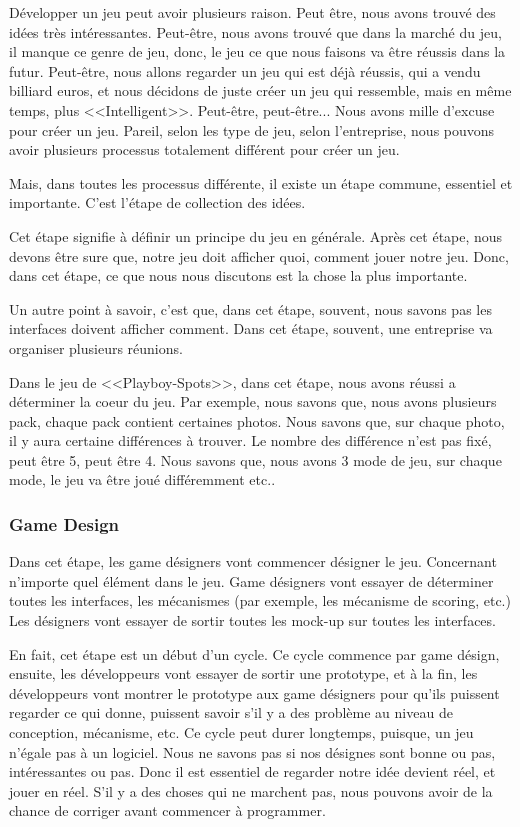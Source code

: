Développer un jeu peut avoir plusieurs raison. Peut être, nous avons trouvé des idées très intéressantes. Peut-être, nous avons trouvé que dans la marché du jeu, il manque ce genre de jeu, donc, le jeu ce que nous faisons va être réussis dans la futur. Peut-être, nous allons regarder un jeu qui est déjà réussis, qui a vendu billiard euros, et nous décidons de juste créer un jeu qui ressemble, mais en même temps, plus <<Intelligent>>. Peut-être, peut-être... Nous avons mille d'excuse pour créer un jeu. Pareil, selon les type de jeu, selon l'entreprise, nous pouvons avoir plusieurs processus totalement différent pour créer un jeu. 

Mais, dans toutes les processus différente, il existe un étape commune, essentiel et importante. C'est l'étape de collection des idées. 

Cet étape signifie à définir un principe du jeu en générale. Après cet étape, nous devons être sure que, notre jeu doit afficher quoi, comment jouer notre jeu. Donc, dans cet étape, ce que nous nous discutons est la chose la plus importante. 

Un autre point à savoir, c'est que, dans cet étape, souvent, nous savons pas les interfaces doivent afficher comment. Dans cet étape, souvent, une entreprise va organiser plusieurs réunions.

Dans le jeu de <<Playboy-Spots>>, dans cet étape, nous avons réussi a déterminer la coeur du jeu. Par exemple, nous savons que, nous avons plusieurs pack, chaque pack contient certaines photos. Nous savons que, sur chaque photo, il y aura certaine différences à trouver. Le nombre des différence n'est pas fixé, peut être 5, peut être 4. Nous savons que, nous avons 3 mode de jeu, sur chaque mode, le jeu va être joué différemment etc..


\subsubsection{Game Design} %

Dans cet étape, les game désigners vont commencer désigner le jeu. Concernant n'importe quel élément dans le jeu. Game désigners vont essayer de déterminer toutes les interfaces, les mécanismes (par exemple, les mécanisme de scoring, etc.) Les désigners vont essayer de sortir toutes les mock-up sur toutes les interfaces. 

En fait, cet étape est un début d'un cycle. Ce cycle commence par game désign, ensuite, les développeurs vont essayer de sortir une prototype, et à la fin, les développeurs vont montrer le prototype aux game désigners pour qu'ils puissent regarder ce qui donne, puissent savoir s'il y a des problème au niveau de conception, mécanisme, etc. Ce cycle peut durer longtemps, puisque, un jeu n'égale pas à un logiciel. Nous ne savons pas si nos désignes sont bonne ou pas, intéressantes ou pas. Donc il est essentiel de regarder notre idée devient réel, et jouer en réel. S'il y a des choses qui ne marchent pas, nous pouvons avoir de la chance de corriger avant commencer à programmer.


